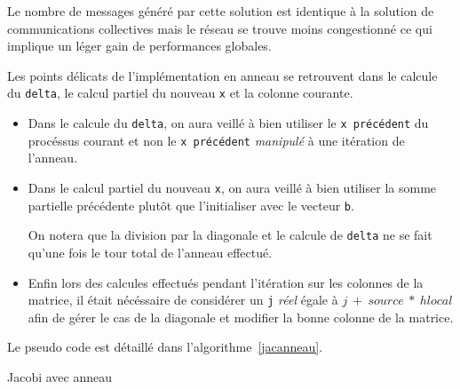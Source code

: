 \documentclass[a4paper]{article}
\begin{document}
Le nombre de messages généré par cette solution est identique à la solution de
communications collectives mais le réseau se trouve moins congestionné ce qui
implique un léger gain de performances globales.

Les points délicats de l'implémentation en anneau se retrouvent dans le 
calcule du \texttt{delta}, le calcul partiel du nouveau \texttt{x} et la colonne
courante. 
\begin{itemize}
\item Dans le calcule du \texttt{delta}, on aura veillé à bien utiliser le 
\texttt{x précédent} du procéssus courant et non le \texttt{x précédent} 
\emph{manipulé} à une itération de l'anneau. 
\item Dans le calcul partiel du nouveau \texttt{x}, on aura veillé à bien utiliser 
la somme partielle précédente plutôt que l'initialiser avec le
vecteur \texttt{b}.

On notera que la division par la diagonale et le calcule de \texttt{delta} ne se 
fait qu'une fois le tour total de l'anneau effectué. 

\item Enfin lors des calcules effectués pendant l'itération sur les 
colonnes de la matrice, il était nécéssaire de considérer un \texttt{j} \emph{réel}
égale à $j~+~source~*~hlocal$ afin de gérer le cas de la diagonale et modifier la 
bonne colonne de la matrice.\\
\end{itemize}

Le pseudo code est détaillé dans l'algorithme~\ref{jacanneau}.

\begin{algorithm}[H]
 \SetLine %
 
 \caption{\label{jacanneau}Jacobi avec anneau}
\end{algorithm}
\end{document}
